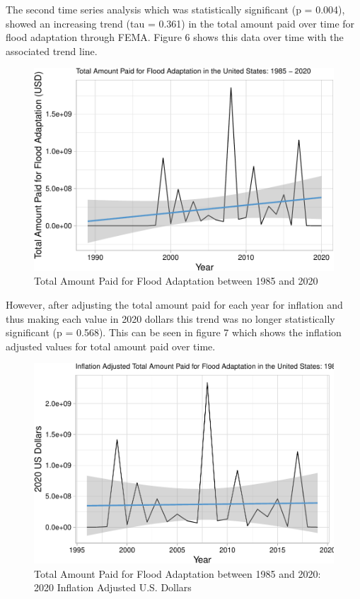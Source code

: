 \documentclass[
  12pt,
]{article}
\begin{document}
The second time series analysis which was statistically significant (p =
0.004), showed an increasing trend (tau = 0.361) in the total amount
paid over time for flood adaptation through FEMA. Figure 6 shows this
data over time with the associated trend line.

\begin{figure}
\centering
\includegraphics{finalreport_files/figure-latex/unnamed-chunk-10-1.pdf}
\caption{Total Amount Paid for Flood Adaptation between 1985 and 2020}
\end{figure}

However, after adjusting the total amount paid for each year for
inflation and thus making each value in 2020 dollars this trend was no
longer statistically significant (p = 0.568). This can be seen in figure
7 which shows the inflation adjusted values for total amount paid over
time.

\begin{figure}
\centering
\includegraphics{finalreport_files/figure-latex/unnamed-chunk-11-1.pdf}
\caption{Total Amount Paid for Flood Adaptation between 1985 and 2020:
2020 Inflation Adjusted U.S. Dollars}
\end{figure}
\end{document}
